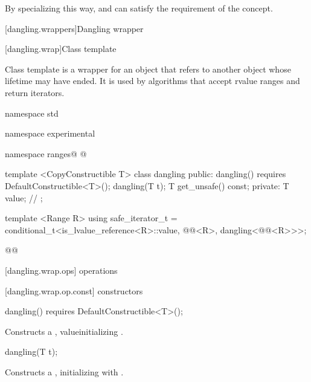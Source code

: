 \begin{addedblock}
{\begin{itemdescr}
\pnum
\enternote By specializing  this way, 
and  can satisfy the  requirement of the
 concept.\exitnote
\end{itemdescr}
} %

[dangling.wrappers]{Dangling wrapper}

[dangling.wrap]{Class template }

\pnum
{}%
Class template  is a wrapper for an object that refers to another object whose
lifetime may have ended. It is used by algorithms that accept rvalue ranges and return iterators.

\begin{codeblock}
namespace std { namespace experimental { namespace ranges@ @ {
  template <CopyConstructible T>
  class dangling {
  public:
    dangling() requires DefaultConstructible<T>();
    dangling(T t);
    T get_unsafe() const;
  private:
    T value; // \expos
  };

  template <Range R>
  using safe_iterator_t =
    conditional_t<is_lvalue_reference<R>::value,
      @@<R>,
      dangling<@@<R>>>;
}}}@\newtxt{\}}@
\end{codeblock}

[dangling.wrap.ops]{ operations}

[dangling.wrap.op.const]{ constructors}

%
\begin{itemdecl}
dangling() requires DefaultConstructible<T>();
\end{itemdecl}

\begin{itemdescr}
\pnum
\effects Constructs a , value\newtxt{-}initializing .
\end{itemdescr}

%
\begin{itemdecl}
dangling(T t);
\end{itemdecl}

\begin{itemdescr}
\pnum
\effects Constructs a , initializing  with .
\end{itemdescr}


\end{addedblock}
